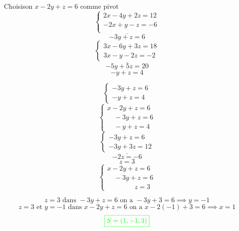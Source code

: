 \documentclass[12pt,a4paper]{article}
\begin{document}
\begin{enumerate}
Choisison $x - 2y + z = 6$ comme pivot 
    \[
\underline{    \begin{cases}
        2x - 4y + 2z = 12 \\
        -2x + y - z = -6 \\
    \end{cases}}
    \]
    \[-3y+z=6\]
    \[
\underline{    \begin{cases}
        3x - 6y + 3z = 18 \\
        3x - y - 2z = -2 
    \end{cases}}
    \]
    \[-5y+5z=20\]
    \[-y+z=4\]

    \[
\begin{cases}
        -3y+z=6 \\
        -y+z=4
    \end{cases}
    \]
        \[
    \begin{cases}
        x - 2y + z = 6 \\
        \quad -3y+z=6 \\
        \quad -y+z=4
    \end{cases}
    \]
    \[
\underline{    \begin{cases}
        -3y+z=6 \\
        -3y+3z=12
    \end{cases}}
    \]
    \[-2z=-6\]
    \[z=3\]
    \[
    \begin{cases}
        x - 2y + z = 6 \\
        \quad -3y+z=6 \\
        \quad\quad\quad\quad z=3
    \end{cases}
    \]
    
    \[z=3 \text{ dans } -3y+z=6  \text{ on a } -3y+3=6 \implies y=-1\]
    \[\text{$z=3 $ et $y=-1$ dans } x - 2y + z = 6  \text{ on a } x - 2(-1) + 3 = 6 \implies x=1\]
\[
\textcolor{green}{\boxed{S = (1,-1,3)   }} 
\]
\end{enumerate}
\end{document}
